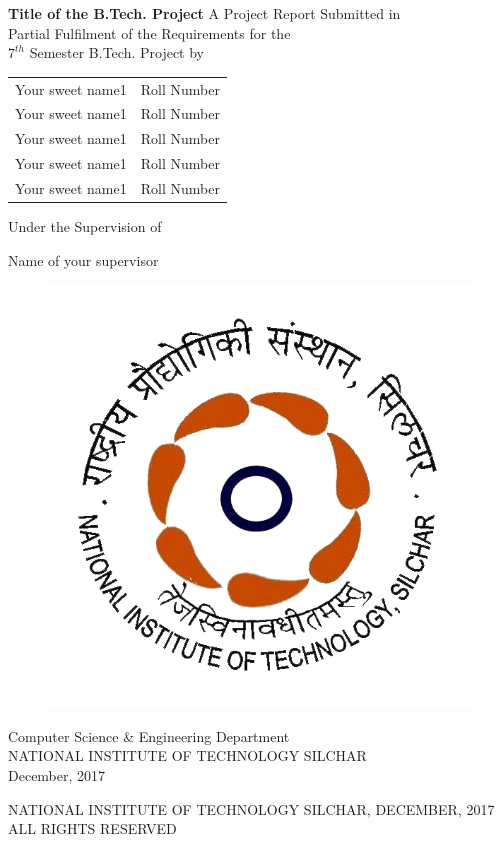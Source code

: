 

\thispagestyle{empty}
\begin{center}
\Large\textbf{Title of the B.Tech. Project}
\vfill
\large{A Project Report Submitted in\\
Partial Fulfilment of the Requirements for the \\
$7^{th}$ Semester B.Tech. Project }
\vfill
by

\begin{table}[h]
\centering
\begin{tabular}{cc}
Your sweet name1 & Roll Number\\
Your sweet name1 & Roll Number\\
Your sweet name1 & Roll Number\\
Your sweet name1 & Roll Number\\
Your sweet name1 & Roll Number\\
\end{tabular}
\end{table}

\vfill
\large{Under the Supervision of 

Name of your supervisor}
\begin{figure}[htpb]
\centering
\includegraphics{Frontmatter/nit}
\end{figure}

\large{Computer Science \& Engineering Department}\\
\large{\MakeUppercase{National Institute of Technology Silchar}}\\
\large{December, 2017}
\end{center}
\newpage
\thispagestyle{empty}
\begin{center}
\small{\textcopyright\MakeUppercase{ National institute of technology Silchar, December, 2017}}\\
\small{\MakeUppercase{All rights reserved}}
\end{center}
